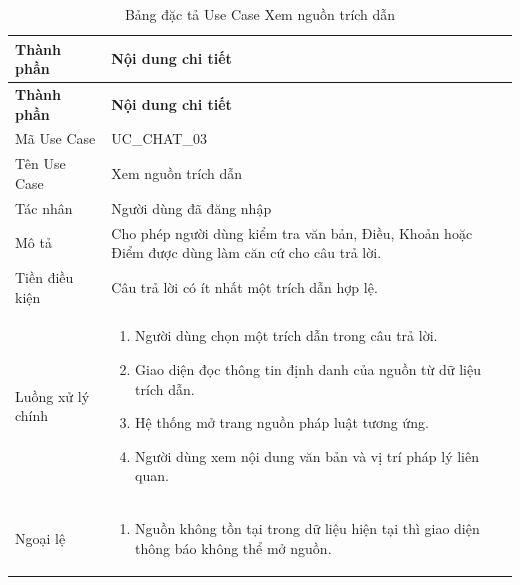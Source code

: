 \documentclass[12pt,a4paper,oneside]{report}
\begin{document}
{
  \begin{longtable}{|L{3.6cm}|L{11.2cm}|}
    \caption{Bảng đặc tả Use Case Xem nguồn trích dẫn}\label{tab:uc-chat-citation}                                        \\
    \hline
    \textbf{Thành phần} & \textbf{Nội dung chi tiết}                                                                        \\
    \hline
    \endfirsthead
    \hline
    \textbf{Thành phần} & \textbf{Nội dung chi tiết}                                                                        \\
    \hline
    \endhead
    Mã Use Case       & UC\_CHAT\_03                                                                                      \\
    \hline
    Tên Use Case      & Xem nguồn trích dẫn                                                                               \\
    \hline
    Tác nhân            & Người dùng đã đăng nhập                                                                           \\
    \hline
    Mô tả               & Cho phép người dùng kiểm tra văn bản, Điều, Khoản hoặc Điểm được dùng làm căn cứ cho câu trả lời. \\
    \hline
    Tiền điều kiện      & Câu trả lời có ít nhất một trích dẫn hợp lệ.                                                      \\
    \hline
    Luồng xử lý chính   & \begin{enumerate}[leftmargin=*,nosep]
                            \item Người dùng chọn một trích dẫn trong câu trả lời.
                            \item Giao diện đọc thông tin định danh của nguồn từ dữ liệu trích dẫn.
                            \item Hệ thống mở trang nguồn pháp luật tương ứng.
                            \item Người dùng xem nội dung văn bản và vị trí pháp lý liên quan.
                          \end{enumerate}                            \\
    \hline
    Ngoại lệ            & \begin{enumerate}[leftmargin=*,nosep]
                            \item Nguồn không tồn tại trong dữ liệu hiện tại thì giao diện thông báo không thể mở nguồn.
                          \end{enumerate}       \\

\end{longtable}}
\end{document}
